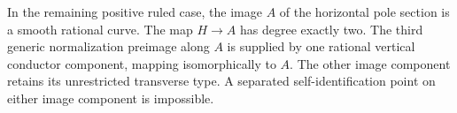 
\begin{proposition}[P4.55]\hypertarget{tag-02XU}{}\label{night:P4.55}\label{stmt:P4.55}


In the remaining positive ruled case, the image $A$ of the
horizontal pole section is a smooth rational curve. The map
$H\to A$ has degree exactly two. The third generic
normalization preimage along $A$ is supplied by one rational
vertical conductor component, mapping isomorphically to $A$.
The other image component retains its unrestricted transverse
type. A separated self-identification point on either image
component is impossible.
\end{proposition}

